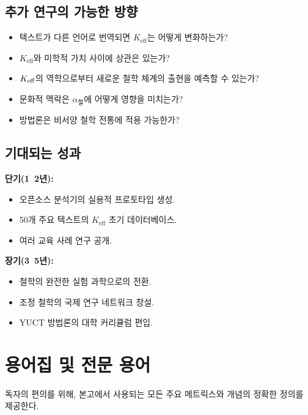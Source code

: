 \documentclass[11pt,a4paper]{article}
\begin{document}
	\subsection{추가 연구의 가능한 방향}
	
	\begin{itemize}
		\item 텍스트가 다른 언어로 번역되면 \(K_{\mathrm{eff}}\)는 어떻게 변화하는가?
		\item \(K_{\mathrm{eff}}\)와 미학적 가치 사이에 상관은 있는가?
		\item \(\Keff\)의 역학으로부터 새로운 철학 체계의 출현을 예측할 수 있는가?
		\item 문화적 맥락은 \(\alpha_{\text{철}}\)에 어떻게 영향을 미치는가?
		\item 방법론은 비서양 철학 전통에 적용 가능한가?
	\end{itemize}
	
	\subsection{기대되는 성과}
	
	\textbf{단기(1~2년):}
	\begin{itemize}
		\item 오픈소스 분석기의 실용적 프로토타입 생성.
		\item 50개 주요 텍스트의 \(K_{\mathrm{eff}}\) 초기 데이터베이스.
		\item 여러 교육 사례 연구 공개.
	\end{itemize}
	
	\textbf{장기(3~5년):}
	\begin{itemize}
		\item 철학의 완전한 실험 과학으로의 전환.
		\item 조정 철학의 국제 연구 네트워크 창설.
		\item YUCT 방법론의 대학 커리큘럼 편입.
	\end{itemize}
	
	\section{용어집 및 전문 용어}
	\label{sec:glossary}
	
	독자의 편의를 위해, 본고에서 사용되는 모든 주요 메트릭스와 개념의 정확한 정의를 제공한다.
	
\end{document}
